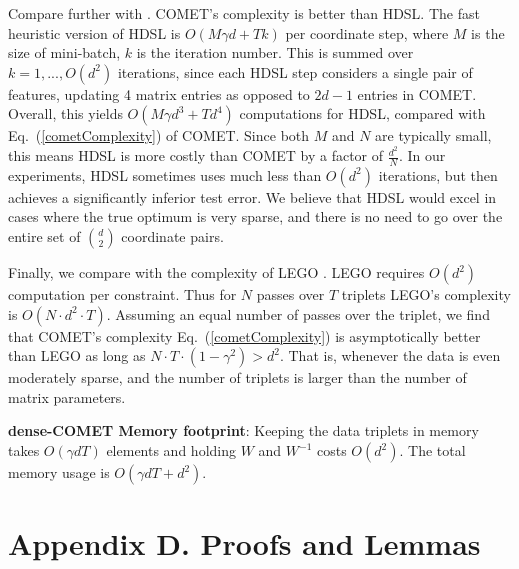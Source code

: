 \documentclass[twoside,11pt]{article}
\newcommand\mat[1]{{#1}}
\newcommand{\W}{\mat{W}}
\renewcommand{\eqref}[1]{Eq.~(\ref{#1})}
\begin{document}
Compare further with \citet{hdsl}. COMET’s complexity is better than HDSL. The fast heuristic version of HDSL is $O(M\gamma d+Tk)$ per coordinate step, where $M$ is the size of mini-batch, $k$ is the iteration number. This is summed over $k=1,...,O(d^2)$ iterations, since each HDSL step considers a single pair of features, updating 4 matrix entries as opposed to $2d-1$ entries in COMET. Overall, this yields $O(M\gamma d^3+Td^4)$ computations for HDSL, compared with \eqref{cometComplexity} of COMET. Since both $M$ and $N$ are typically small, this means HDSL is more costly than COMET by a factor of $\frac{d^2}{N}$. In our experiments, HDSL sometimes uses much less than $O(d^2)$ iterations, but then achieves a significantly inferior test error. We believe that HDSL would excel in cases where the true optimum is very sparse, and there is no need to go over the entire set of $d \choose 2$ coordinate pairs.

Finally, we compare with the complexity of LEGO \citep{lego}. LEGO requires $O(d^2)$ computation per constraint. Thus for $N$ passes over $T$ triplets LEGO's complexity is $O(N\cdot d^2 \cdot T)$. Assuming an equal number of passes over the triplet, we find that COMET's complexity \eqref{cometComplexity} is asymptotically better than LEGO as long as $N \cdot T \cdot (1-\gamma^2) > d^2$. That is, whenever the data is even moderately sparse, and the number of triplets is larger than the number of matrix parameters.

{\bf dense-COMET Memory footprint}: Keeping the data triplets in memory takes $O(\gamma d T)$ elements and holding $\W$ and $\W^{-1}$ costs $O(d^2)$. The total memory usage is $O(\gamma d T + d^2)$. 



\section*{Appendix D. Proofs and Lemmas}
\end{document}
